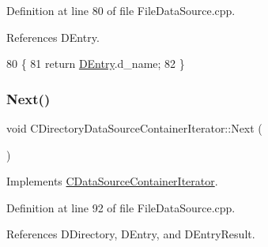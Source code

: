 Definition at line 80 of file File\+Data\+Source.\+cpp.



References D\+Entry.


\begin{DoxyCode}
80                                                      \{
81     \textcolor{keywordflow}{return} \hyperlink{classCDirectoryDataSourceContainerIterator_a69dfb8a9f2ab7f71e7d106d4d6c0e29b}{DEntry}.d\_name;
82 \}
\end{DoxyCode}
\hypertarget{classCDirectoryDataSourceContainerIterator_a2b58c5a78c5820e39cd2d9a61724a55e}{}\label{classCDirectoryDataSourceContainerIterator_a2b58c5a78c5820e39cd2d9a61724a55e} 
\subsubsection{\texorpdfstring{Next()}{Next()}}
{\footnotesize\ttfamily void C\+Directory\+Data\+Source\+Container\+Iterator\+::\+Next (\begin{DoxyParamCaption}{ }\end{DoxyParamCaption})\hspace{0.3cm}{\ttfamily [virtual]}}



Implements \hyperlink{classCDataSourceContainerIterator_a2a9cc99d17cd217727ac4ab5e78f1a35}{C\+Data\+Source\+Container\+Iterator}.



Definition at line 92 of file File\+Data\+Source.\+cpp.



References D\+Directory, D\+Entry, and D\+Entry\+Result.


